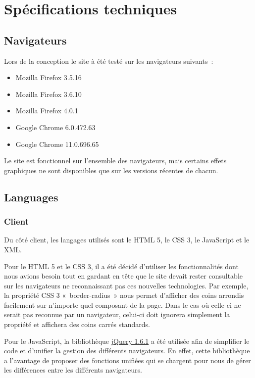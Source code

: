 \documentclass[letter, 11pt]{report}
\begin{document}
\section{Spécifications techniques}


\subsection{Navigateurs}
Lors de la conception le site à été testé sur les navigateurs suivants~:

\begin{itemize}
	\item Mozilla Firefox 3.5.16
	\item Mozilla Firefox 3.6.10
	\item Mozilla Firefox 4.0.1
	\item Google Chrome 6.0.472.63
	\item Google Chrome 11.0.696.65
\end{itemize}

Le site est fonctionnel sur l'ensemble des navigateurs, mais certains effets graphiques ne sont disponibles que sur les versions récentes de chacun.

\subsection{Languages}
\subsubsection{Client}
Du côté client, les langages utilisés sont le HTML 5, le CSS 3, le JavaScript et le XML.

Pour le HTML 5 et le CSS 3, il a été décidé d'utiliser les fonctionnalités dont nous avions besoin tout en gardant en tête que le site devait rester consultable sur les navigateurs ne reconnaissant pas ces nouvelles technologies. Par exemple, la propriété CSS 3 «~border-radius~» nous permet d'afficher des coins arrondis facilement sur n'importe quel composant de la page. Dans le cas où celle-ci ne serait pas reconnue par un navigateur, celui-ci doit ignorera simplement la propriété et affichera des coins carrés standards.

Pour le JavaScript, la bibliothèque \href{http://jquery.com/}{jQuery 1.6.1} a été utilisée afin de simplifier le code et d'unifier la gestion des différents navigateurs. En effet, cette bibliothèque a l'avantage de proposer des fonctions unifiées qui se chargent pour nous de gérer les différences entre les différents navigateurs.
\end{document}
